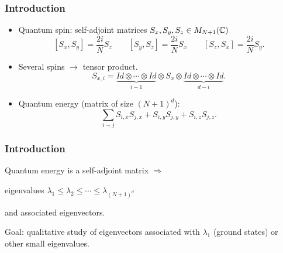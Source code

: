 \documentclass[mathserif]{beamer}
\begin{document}
    \begin{frame}\frametitle{Introduction}
	\begin{itemize}
		\item Quantum spin: self-adjoint matrices
                  $S_x,S_y,S_z\in M_{N+1}(\mathbb{C})$ \[[S_x,S_y]=\frac{2i}{N}S_z\qquad
                    [S_y,S_z]=\frac{2i}{N}S_x\qquad [S_z,S_x]=\frac{2i}{N}S_y.\]
                \item Several spins $\rightarrow$ {\color{myorange} tensor product}.
                    \[S_{x,i}=\underbrace{Id\otimes \cdots\otimes Id}_{i-1}\otimes S_x\otimes
                                                                              \underbrace{Id\otimes
                                                                                \cdots
                                                                              \otimes
                                                                              Id}_{d-i}.\]
                                                                          
                                                                        \item<2>
                                                                          Quantum
                                                                          energy
                                                                          (matrix
                                                                          of
                                                                          size
                                                                          $(N+1)^d$):
                                                                          \[
                                                                            \sum_{i\sim j}S_{i,x}S_{j,x}+S_{i,y}S_{j,y}+S_{i,z}S_{j,z}.\]
                    
      
      \end{itemize}
    \end{frame}
    \begin{frame}
      \frametitle{Introduction}
      Quantum energy is a self-adjoint matrix $\Rightarrow$
      
      \hspace{1em}eigenvalues
      $\lambda_1\leq \lambda_2\leq \cdots\leq \lambda_{(N+1)^d}$

      \hspace{1em}and associated eigenvectors.
      
      Goal: qualitative study of eigenvectors associated with
      $\lambda_1$ (ground states) or other small eigenvalues.
      
      \hfill
      
    \end{frame}
\end{document}
